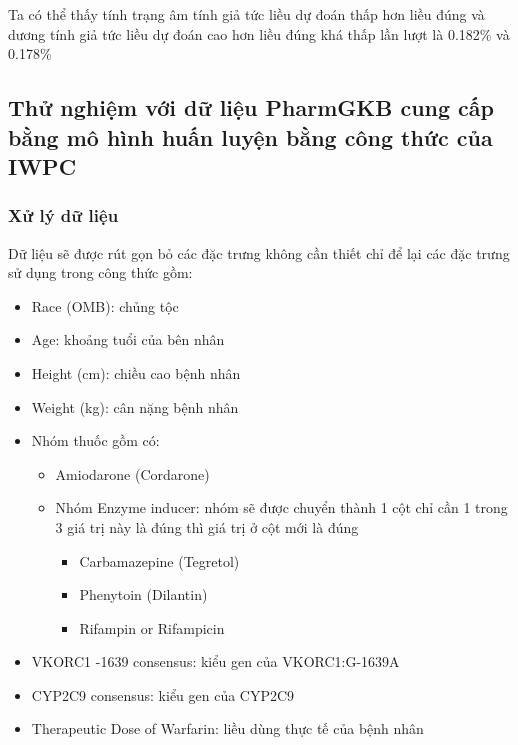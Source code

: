 \documentclass[14pt,oneside]{scrbook}
\providecommand{\tightlist}{\setlength{\itemsep}{\smallskipamount}\setlength{\parskip}{\smallskipamount}}
\begin{document}
Ta có thể thấy tính trạng âm tính giả tức liều dự đoán thấp hơn liều
đúng và dương tính giả tức liều dự đoán cao hơn liều đúng khá thấp lần
lượt là 0.182\% và 0.178\%

\subsection{Thử nghiệm với dữ liệu PharmGKB cung cấp bằng mô hình huấn
luyện bằng công thức của
IWPC}\label{thux1eed-nghiux1ec7m-vux1edbi-dux1eef-liux1ec7u-pharmgkb-cung-cux1ea5p-bux1eb1ng-muxf4-huxecnh-huux1ea5n-luyux1ec7n-bux1eb1ng-cuxf4ng-thux1ee9c-cux1ee7a-iwpc}

\subsubsection{Xử lý dữ liệu}\label{xux1eed-luxfd-dux1eef-liux1ec7u}

Dữ liệu sẽ được rút gọn bỏ các đặc trưng không cần thiết chỉ để lại các
đặc trưng sử dụng trong công thức gồm:

\begin{itemize}
\tightlist
\item
  Race (OMB): chủng tộc
\item
  Age: khoảng tuổi của bên nhân
\item
  Height (cm): chiều cao bệnh nhân
\item
  Weight (kg): cân nặng bệnh nhân
\item
  Nhóm thuốc gồm có:

  \begin{itemize}
  \tightlist
  \item
    Amiodarone (Cordarone)
  \item
    Nhóm Enzyme inducer: nhóm sẽ được chuyển thành 1 cột chỉ cần 1 trong
    3 giá trị này là đúng thì giá trị ở cột mới là đúng

    \begin{itemize}
    \tightlist
    \item
      Carbamazepine (Tegretol)
    \item
      Phenytoin (Dilantin)
    \item
      Rifampin or Rifampicin
    \end{itemize}
  \end{itemize}
\item
  VKORC1 -1639 consensus: kiểu gen của VKORC1:G-1639A
\item
  CYP2C9 consensus: kiểu gen của CYP2C9
\item
  Therapeutic Dose of Warfarin: liều dùng thực tế của bệnh nhân
\end{itemize}
\end{document}
